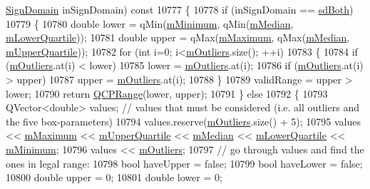 \begin{DoxyCode}
      \hyperlink{a00024_a661743478a1d3c09d28ec2711d7653d8}{SignDomain} inSignDomain)\textcolor{keyword}{ const}
10777 \textcolor{keyword}{}\{
10778   \textcolor{keywordflow}{if} (inSignDomain == \hyperlink{a00024_a661743478a1d3c09d28ec2711d7653d8a082b98cfb91a7363a3b5cd17b0c1cd60}{sdBoth})
10779   \{
10780     \textcolor{keywordtype}{double} lower = qMin(\hyperlink{a00050_a7143ece4e7e5f9ac010739fbc390bf0c}{mMinimum}, qMin(\hyperlink{a00050_ae43287ca13c8166bde2ac19bf0969d23}{mMedian}, \hyperlink{a00050_acac86cac93d9fa3d820b5aaa04ed96f6}{mLowerQuartile}));
10781     \textcolor{keywordtype}{double} upper = qMax(\hyperlink{a00050_a16266f1e0e4e8e95b5d141c49479ef2e}{mMaximum}, qMax(\hyperlink{a00050_ae43287ca13c8166bde2ac19bf0969d23}{mMedian}, \hyperlink{a00050_a865afbcca332ee851aa45807381bc80e}{mUpperQuartile}));
10782     \textcolor{keywordflow}{for} (\textcolor{keywordtype}{int} i=0; i<\hyperlink{a00050_a415e2f77a89396c2af999afe027bdf6c}{mOutliers}.size(); ++i)
10783     \{
10784       \textcolor{keywordflow}{if} (\hyperlink{a00050_a415e2f77a89396c2af999afe027bdf6c}{mOutliers}.at(i) < lower)
10785         lower = \hyperlink{a00050_a415e2f77a89396c2af999afe027bdf6c}{mOutliers}.at(i);
10786       \textcolor{keywordflow}{if} (\hyperlink{a00050_a415e2f77a89396c2af999afe027bdf6c}{mOutliers}.at(i) > upper)
10787         upper = \hyperlink{a00050_a415e2f77a89396c2af999afe027bdf6c}{mOutliers}.at(i);
10788     \}
10789     validRange = upper > lower;
10790     \textcolor{keywordflow}{return} \hyperlink{a00049}{QCPRange}(lower, upper);
10791   \} \textcolor{keywordflow}{else}
10792   \{
10793     QVector<double> values; \textcolor{comment}{// values that must be considered (i.e. all outliers and the five
       box-parameters)}
10794     values.reserve(\hyperlink{a00050_a415e2f77a89396c2af999afe027bdf6c}{mOutliers}.size() + 5);
10795     values << \hyperlink{a00050_a16266f1e0e4e8e95b5d141c49479ef2e}{mMaximum} << \hyperlink{a00050_a865afbcca332ee851aa45807381bc80e}{mUpperQuartile} << \hyperlink{a00050_ae43287ca13c8166bde2ac19bf0969d23}{mMedian} << 
      \hyperlink{a00050_acac86cac93d9fa3d820b5aaa04ed96f6}{mLowerQuartile} << \hyperlink{a00050_a7143ece4e7e5f9ac010739fbc390bf0c}{mMinimum};
10796     values << \hyperlink{a00050_a415e2f77a89396c2af999afe027bdf6c}{mOutliers};
10797     \textcolor{comment}{// go through values and find the ones in legal range:}
10798     \textcolor{keywordtype}{bool} haveUpper = \textcolor{keyword}{false};
10799     \textcolor{keywordtype}{bool} haveLower = \textcolor{keyword}{false};
10800     \textcolor{keywordtype}{double} upper = 0;
10801     \textcolor{keywordtype}{double} lower = 0;

\end{DoxyCode}
